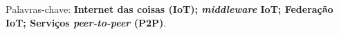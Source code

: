 

\noindent
\lipsum[5]
\noindent
Palavras-chave: \textbf{Internet das coisas (IoT); \textit{middleware} IoT; Federação IoT; Serviços \textit{peer-to-peer} (P2P)}.




